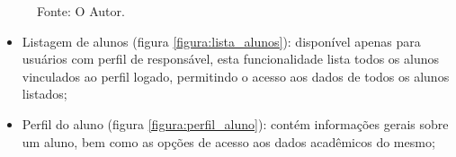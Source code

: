 \begin{figure}[H]
\begin{minipage}[b]{0.45\linewidth}
    	\label{figura:menu_principal}
    	\captionsetup{singlelinecheck = false, format= hang, justification=raggedright, labelsep=space, width=6.5cm}
    	\caption*{\footnotesize Fonte: O Autor.}
    \end{minipage}
\end{figure}

\begin{itemize}
	\item Listagem de alunos (figura \ref{figura:lista_alunos}): disponível apenas para usuários com perfil de responsável, esta funcionalidade lista todos os alunos vinculados ao perfil logado, permitindo o acesso aos dados de todos os alunos listados;
	\item Perfil do aluno (figura \ref{figura:perfil_aluno}): contém informações gerais sobre um aluno, bem como as opções de acesso aos dados acadêmicos do mesmo;
\end{itemize}

